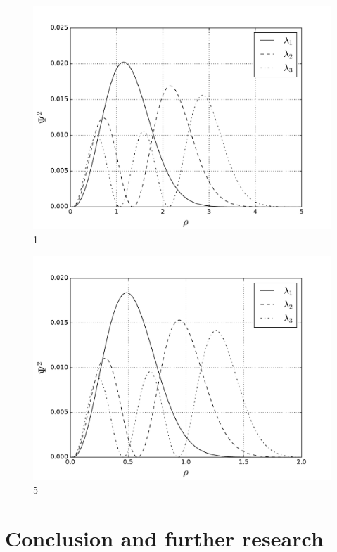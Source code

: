 \documentclass[10pt]{article}
\begin{document}
\begin{figure}
  \begin{center}
    \includegraphics[scale=0.7]{two_1}
    \caption{1}
    \label{fig:omega_1}
  \end{center}
\end{figure}
\newpage

\begin{figure}
  \begin{center}
    \includegraphics[scale=0.7]{two_5}
    \caption{5}
    \label{fig:omega_5}
  \end{center}
\end{figure}
\newpage


\section{Conclusion and further research}
\end{document}
